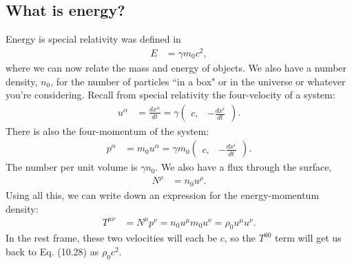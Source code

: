 \documentclass[a4paper, 11pt, normalem]{report}
\begin{document}
\section{What is energy?}
Energy is special relativity was defined in
\begin{align}
    E &= \gamma m_0c^2,
\end{align}
where we can now relate the mass and energy of objects.
We also have a number density, $n_0$, for the number of particles ``in a box" or in the universe or whatever you're considering.
Recall from special relativity the four-velocity of a system:
\begin{align}
    u^\alpha &= \frac{dx^\alpha}{dt} = \gamma\begin{pmatrix} c, & -\frac{dx^i}{dt}\end{pmatrix}.
\end{align}
There is also the four-momentum of the system:
\begin{align}
    p^\alpha &= m_0u^\alpha = \gamma m_0\begin{pmatrix} c, & -\frac{dx^i}{dt} \end{pmatrix}.
\end{align}
The number per unit volume is $\gamma n_0$.
We also have a flux through the surface,
\begin{align}
    N^\rho &= n_0u^\rho.
\end{align}
Using all this, we can write down an expression for the energy-momentum density:
\begin{align}
    T^{\mu\nu} &= N^\mu p^\nu = n_0u^\mu m_0u^\nu = \rho_0 u^\mu u^\nu.
\end{align}
In the rest frame, these two velocities will each be $c$, so the $T^{00}$ term will get us back to Eq. (10.28) as $\rho_0 c^2$.

\chapter{}

\chapter{}

\chapter{}

\chapter{}
\end{document}
